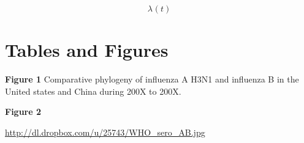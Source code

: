 \documentclass[12pt]{article}
\begin{document}

\[\lambda_{}(t)\]
 
\section*{Tables and Figures}

{\bf Figure 1} Comparative phylogeny of influenza A H3N1 and influenza B in the United states and China during 200X to 200X.

{\bf Figure 2} 

\url{http://dl.dropbox.com/u/25743/WHO_sero_AB.jpg}


\clearpage


\end{document}
